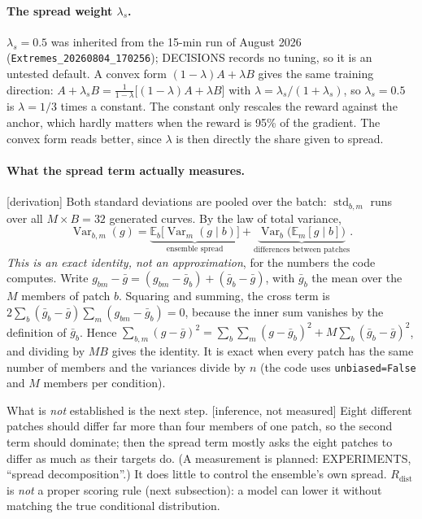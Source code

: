 \documentclass[11pt,a4paper]{article}
\newcommand{\E}{\mathbb{E}}
\newcommand{\status}[1]{\textsf{\small[#1]}}
\begin{document}
\paragraph{The spread weight $\lambda_s$.} $\lambda_s = 0.5$ was inherited from the 15-min run of August 2026
(\texttt{Extremes\_20260804\_170256}); DECISIONS records no tuning, so it is an untested default. A convex form
$(1-\lambda)A + \lambda B$ gives the same training direction: $A + \lambda_s B = \frac{1}{1-\lambda}\big[(1-\lambda)A +
\lambda B\big]$ with $\lambda = \lambda_s/(1+\lambda_s)$, so $\lambda_s = 0.5$ is $\lambda = 1/3$ times a constant. The
constant only rescales the reward against the anchor, which hardly matters when the reward is 95\% of the gradient. The
convex form reads better, since $\lambda$ is then directly the share given to spread.

\paragraph{What the spread term actually measures.} \status{derivation} Both standard deviations are pooled over the
batch: $\operatorname{std}_{b,m}$ runs over all $M\times B = 32$ generated curves. By the law of total variance,
\begin{equation}
  \operatorname{Var}_{b,m}(g) = \underbrace{\E_b\big[\operatorname{Var}_m(g\mid b)\big]}_{\text{ensemble spread}}
  + \underbrace{\operatorname{Var}_b\big(\E_m[g\mid b]\big)}_{\text{differences between patches}} .
\end{equation}
\emph{This is an exact identity, not an approximation}, for the numbers the code computes. Write
$g_{bm} - \bar g = (g_{bm} - \bar g_b) + (\bar g_b - \bar g)$, with $\bar g_b$ the mean over the $M$ members of patch
$b$. Squaring and summing, the cross term is $2\sum_b(\bar g_b - \bar g)\sum_m(g_{bm}-\bar g_b) = 0$, because the inner
sum vanishes by the definition of $\bar g_b$. Hence
$\sum_{b,m}(g-\bar g)^2 = \sum_b\sum_m(g-\bar g_b)^2 + M\sum_b(\bar g_b-\bar g)^2$, and dividing by $MB$ gives the
identity. It is exact when every patch has the same number of members and the variances divide by $n$ (the code uses
\texttt{unbiased=False} and $M$ members per condition).

What is \emph{not} established is the next step. \status{inference, not measured} Eight different patches should differ
far more than four members of one patch, so the second term should dominate; then the spread term mostly asks the eight
patches to differ as much as their targets do. (A measurement is planned: EXPERIMENTS, ``spread decomposition''.) It does little to control the
ensemble's own spread. $R_{\mathrm{dist}}$ is \emph{not} a proper scoring rule (next subsection): a model can lower it
without matching the true conditional distribution.
\end{document}
